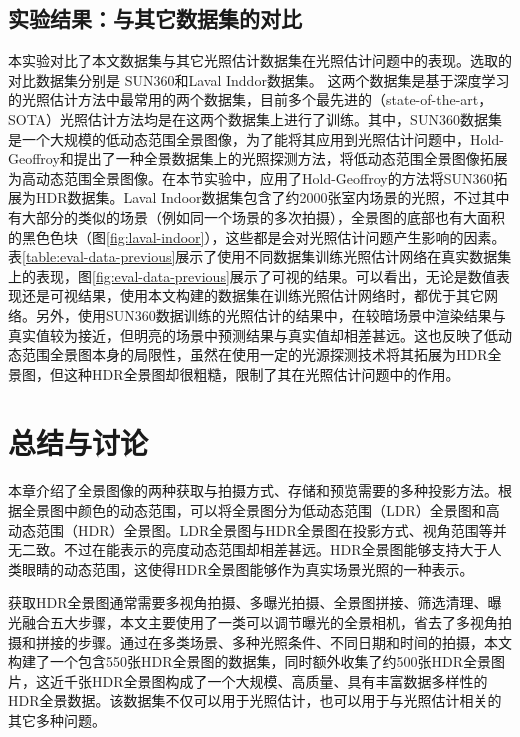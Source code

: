 \subsection{实验结果：与其它数据集的对比}

本实验对比了本文数据集与其它光照估计数据集在光照估计问题中的表现。选取的对比数据集分别是
SUN360\cite{xiao2012recognizing}和Laval Inddor\cite{gardner2017learning}数据集。
这两个数据集是基于深度学习的光照估计方法中最常用的两个数据集，目前多个最先进的（state-of-the-art，SOTA）光照估计方法均是在这两个数据集上进行了训练。其中，SUN360数据集是一个大规模的低动态范围全景图像，为了能将其应用到光照估计问题中，Hold-Geoffroy\cite{hold2017deep}和\cite{gardner2017learning}提出了一种全景数据集上的光照探测方法，将低动态范围全景图像拓展为高动态范围全景图像。在本节实验中，应用了Hold-Geoffroy的方法将SUN360拓展为HDR数据集。Laval Indoor数据集包含了约2000张室内场景的光照，不过其中有大部分的类似的场景（例如同一个场景的多次拍摄），全景图的底部也有大面积的黑色色块（图\ref{fig:laval-indoor}），这些都是会对光照估计问题产生影响的因素。表\ref{table:eval-data-previous}展示了使用不同数据集训练光照估计网络在真实数据集上的表现，图\ref{fig:eval-data-previous}展示了可视的结果。可以看出，无论是数值表现还是可视结果，使用本文构建的数据集在训练光照估计网络时，都优于其它网络。另外，使用SUN360数据训练的光照估计的结果中，在较暗场景中渲染结果与真实值较为接近，但明亮的场景中预测结果与真实值却相差甚远。这也反映了低动态范围全景图本身的局限性，虽然在使用一定的光源探测技术将其拓展为HDR全景图，但这种HDR全景图却很粗糙，限制了其在光照估计问题中的作用。


\section{总结与讨论}
本章介绍了全景图像的两种获取与拍摄方式、存储和预览需要的多种投影方法。根据全景图中颜色的动态范围，可以将全景图分为低动态范围（LDR）全景图和高动态范围（HDR）全景图。LDR全景图与HDR全景图在投影方式、视角范围等并无二致。不过在能表示的亮度动态范围却相差甚远。HDR全景图能够支持大于人类眼睛的动态范围，这使得HDR全景图能够作为真实场景光照的一种表示。

获取HDR全景图通常需要多视角拍摄、多曝光拍摄、全景图拼接、筛选清理、曝光融合五大步骤，本文主要使用了一类可以调节曝光的全景相机，省去了多视角拍摄和拼接的步骤。通过在多类场景、多种光照条件、不同日期和时间的拍摄，本文构建了一个包含550张HDR全景图的数据集，同时额外收集了约500张HDR全景图片，这近千张HDR全景图构成了一个大规模、高质量、具有丰富数据多样性的HDR全景数据。该数据集不仅可以用于光照估计，也可以用于与光照估计相关的其它多种问题。

